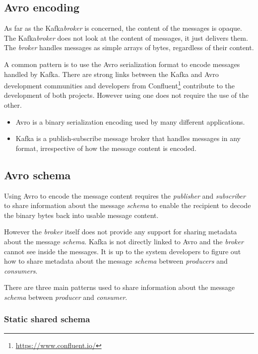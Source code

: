 \documentclass{article}
\newcommand{\avro} {Avro\xspace}
\newcommand{\kafka} {Kafka\xspace}
\newcommand{\kfbroker} {\textit{broker}\xspace}
\newcommand{\kfconsumer} {\textit{consumer}\xspace}
\newcommand{\kfconsumers} {\textit{consumers}\xspace}
\newcommand{\kfproducer} {\textit{producer}\xspace}
\newcommand{\kfproducers} {\textit{producers}\xspace}
\newcommand{\kfpublisher} {\textit{publisher}\xspace}
\newcommand{\kfsubscriber} {\textit{subscriber}\xspace}
\newcommand{\confluent} {Confluent\xspace}
\newcommand{\avschema} {\textit{schema}\xspace}
\newcommand{\footurl}[1] {\footnote{\url{#1}}}
\begin{document}
\subsection{Avro encoding}
\label{avro-encoding}

As far as the \kafka \kfbroker is concerned, the content of the messages is opaque. The \kafka \kfbroker does not look at the content of messages, it just delivers them.
The \kfbroker handles messages as simple arrays of bytes, regardless of their content.

A common pattern is to use the  \avro serialization format to encode messages handled by \kafka.
There are strong links between the \kafka and \avro development 
communities and developers from \confluent \footurl{https://www.confluent.io/} contribute to the development of both projects.
However using one does not require the use of the other.

\begin{itemize}
    \item \avro is a binary serialization encoding used by many different applications.
    \item \kafka is a publish-subscribe message broker that handles messages in any format, irrespective of how the message content is encoded.
\end{itemize}

\subsection{Avro schema}
\label{avro-schema}

Using \avro to encode the message content requires the \kfpublisher and \kfsubscriber to share information about the message \avschema to enable the recipient to decode the binary bytes back into usable message content.

However the \kfbroker itself does not provide any support for sharing metadata about the message \avschema. \kafka is not directly linked to \avro and the \kfbroker cannot see inside the messages. It is up to the system developers to figure out how to share metadata about the message \avschema between \kfproducers and \kfconsumers. 

There are three main patterns used to share information about the message \avschema between \kfproducer and \kfconsumer.

\subsubsection{Static shared schema}
\label{avro-static-schema}
\end{document}
